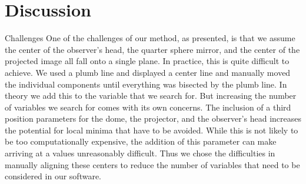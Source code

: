 \documentclass[10pt,letterpaper]{article}
\newcommand{\lorem}{{\bf LOREM}}
\newcommand{\ipsum}{{\bf IPSUM}}
\begin{document}
%
%
%
%
%

\section*{Discussion}

Challenges
One of the challenges of our method, as presented, is that we assume the center of the observer’s head, the quarter sphere mirror, and the center of the 
projected image all fall onto a single plane. In practice, this is quite difficult to achieve. We used a plumb line and displayed a center line and manually moved the 
individual components until everything was bisected by the plumb line. In theory we add this to the variable that we search for. But increasing the number of 
variables we search for comes with its own concerns. The inclusion of a third position parameters for the dome, the projector, and the observer’s head increases 
the potential for local minima that have to be avoided. While this is not likely to be too computationally expensive, the addition of this parameter can make arriving 
at a values unreasonably difficult. Thus we chose the difficulties in manually aligning these centers to reduce the number of variables that need to be considered in 
our software. 
\end{document}
